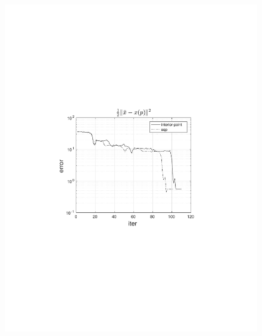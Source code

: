 \begin{frame}
\begin{columns}[t]
\begin{figure}
                \includegraphics[trim=4cm 9cm 4cm 8.5cm, clip=true, width=\linewidth]{img/convPlotX}
            \end{figure}
    \end{columns}
\end{frame}

